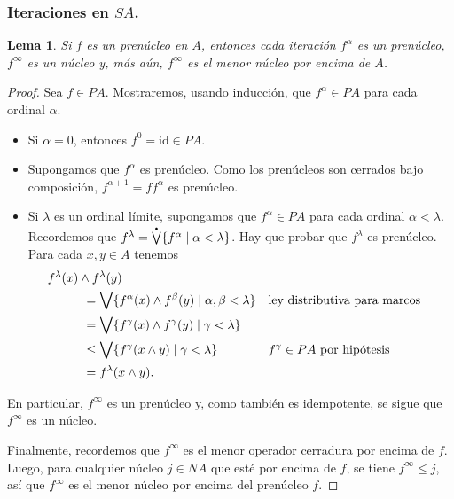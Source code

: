 \documentclass[12pt,letterpaper,titlepage]{article}
\newtheorem{lemma}{Lema}
\theoremstyle{definition}
\newcommand\Sup{\bigvee}
\renewcommand\inf{\wedge}
\newcommand\pSup{%
    {\stackrel{\raisebox{-3pt}{\scalebox{0.5}{$\bullet$}}}{\bigvee}}
  }%
\newcommand\tps[2]{\texorpdfstring{#1}{#2}}
\newcommand\<{\langle}
\renewcommand\>{\rangle}
\newcommand{\id}{\mathrm{id}}
\begin{document}
\subsubsection{Iteraciones en \tps{$SA$}{SA}.}

\begin{lemma}
  Si $f$ es un prenúcleo en $A$, entonces cada iteración
  $f^\alpha$ es un prenúcleo, $f^\infty$ es un núcleo y, más aún,
  $f^\infty$ es el menor núcleo por encima de $A$.
\end{lemma}
\begin{proof}
  Sea $f\in PA$.
  Mostraremos, usando inducción, que $f^\alpha\in PA$ para cada
  ordinal $\alpha$.
  \begin{itemize}
    \item Si $\alpha=0$, entonces $f^0=\id\in PA$.
    \item Supongamos que $f^\alpha$ es prenúcleo.
    Como los prenúcleos son cerrados bajo composición,
    $f^{\alpha+1}=ff^\alpha$ es prenúcleo.
    \item Si $\lambda$ es un ordinal límite, supongamos que
    $f^\alpha\in PA$ para cada ordinal $\alpha<\lambda$.
    Recordemos que
    $f^\lambda=\pSup\{f^\alpha\mid\alpha<\lambda\}$.
    Hay que probar que $f^\lambda$ es prenúcleo.
    Para cada $x,y\in A$ tenemos
    \begin{align*}
      &f^\lambda(x) \inf f^\lambda(y) \\
      &\hspace{10mm}
      = \Sup\{f^\alpha(x) \inf f^\beta(y) \mid
        \alpha,\beta<\lambda\}
        && \text{ley distributiva para marcos} \\
      &\hspace{10mm}
      = \Sup\{f^\gamma(x)\inf f^\gamma(y)
        \mid \gamma<\lambda\} \\
      &\hspace{10mm}
      \leq \Sup\{f^\gamma(x\inf y) \mid \gamma<\lambda\}
        && f^\gamma\in PA \text{ por hipótesis}\\
      &\hspace{10mm}
      = f^\lambda(x\inf y).
    \end{align*}
  \end{itemize}
  En particular, $f^\infty$ es un prenúcleo y, como también es
  idempotente, se sigue que $f^\infty$ es un núcleo.

  Finalmente, recordemos que $f^\infty$ es el menor operador
  cerradura por encima de $f$.
  Luego, para cualquier núcleo $j\in NA$ que esté por encima de
  $f$, se tiene $f^\infty\leq j$, así que $f^\infty$ es el menor
  núcleo por encima del prenúcleo $f$.
\end{proof}
\end{document}
